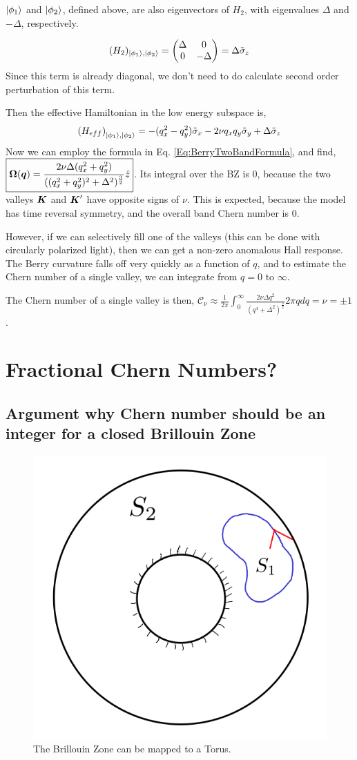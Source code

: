 \documentclass{report}
\renewcommand\vec[1]{\ensuremath\boldsymbol{#1}} %
\begin{document}
$\ket{\phi_1}$ and $\ket{\phi_2}$, defined above, are also eigenvectors of $H_2$, with eigenvalues $\Delta$ and $-\Delta$, respectively.

$$ (H_2)_{\ket{\phi_1}, \ket{\phi_2}} = \begin{pmatrix}
	\Delta & 0 \\
	0 & -\Delta
\end{pmatrix} = \Delta \tilde{\sigma}_z
$$
Since this term is already diagonal, we don't need to do calculate second order perturbation of this term.

Then the effective Hamiltonian in the low energy subspace is,
\begin{equation}\label{Eq:EffectiveHamiltonian}
	\left(H_{eff}\right)_{\ket{\phi_1}, \ket{\phi_2}} = -(q_x^2 - q_y^2) \tilde{\sigma}_x - 2 \nu q_x q_y \tilde{\sigma}_y + \Delta \tilde{\sigma}_z 
\end{equation}
Now we can employ the formula in Eq. \ref{Eq:BerryTwoBandFormula}, and find, $\boxed{\vec{\Omega}(\vec{q}) = \frac{2 \nu \Delta (q_x^2 + q_y^2)}{((q_x^2 + q_y^2)^2 + \Delta^2)^{\frac{3}{2}}}    \hat{z}}$.
Its integral over the BZ is 0, because the two valleys $\vec{K}$ and $\vec{K}'$ have opposite signs of $\nu$. This is expected, because the model has time reversal symmetry, and the overall band Chern number is 0.

However, if we can selectively fill one of the valleys (this can be done with circularly polarized light), then we can get a non-zero anomalous Hall response. The Berry curvature falls off very quickly as a function of $q$, and to estimate the Chern number of a single valley, we can integrate from $q = 0$ to $\infty$.

The Chern number of a single valley is then, $\boxed{\mathcal{C}_{\nu} \approx \frac{1}{2\pi} \int_0^{\infty} \frac{2 \nu \Delta q^2}{(q^4 + \Delta^2)^{\frac{3}{2}}} 2 \pi q dq = \nu = \pm 1}$.

\section{Fractional Chern Numbers?}
\subsection{Argument why Chern number should be an integer for a closed Brillouin Zone}\label{sebsec:integer-chern-argument}

\begin{figure}[h!]
	\centering
	\includegraphics[width=0.4\linewidth]{torus}
	\caption{The Brillouin Zone can be mapped to a Torus.}
	\label{fig:torus}
\end{figure}
\end{document}
